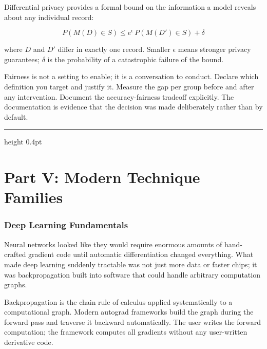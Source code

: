 \documentclass[12pt,a4paper]{article}
\begin{document}
Differential privacy provides a formal bound on the information a model
reveals about any individual record:

\begin{equation*}
  P(M(D)\in S) \leq e^\epsilon\, P(M(D')\in S) + \delta
\end{equation*}

where $D$ and $D'$ differ in exactly one record. Smaller $\epsilon$ means
stronger privacy guarantees; $\delta$ is the probability of a catastrophic
failure of the bound.

\begin{mentalmodel}
Fairness is not a setting to enable; it is a conversation to conduct.
Declare which definition you target and justify it. Measure the gap per
group before and after any intervention. Document the accuracy-fairness
tradeoff explicitly. The documentation is evidence that the decision was
made deliberately rather than by default.
\end{mentalmodel}

\vspace{10pt}\hrule height 0.4pt\vspace{14pt}

\part*{Part V: Modern Technique Families}

\section*{Deep Learning Fundamentals}

Neural networks looked like they would require enormous amounts of
hand-crafted gradient code until automatic differentiation changed
everything. What made deep learning suddenly tractable was not just more
data or faster chips; it was backpropagation built into software that
could handle arbitrary computation graphs.

\begin{concept}
Backpropagation is the chain rule of calculus applied systematically to
a computational graph. Modern autograd frameworks build the graph during
the forward pass and traverse it backward automatically. The user writes
the forward computation; the framework computes all gradients without any
user-written derivative code.
\end{concept}
\end{document}
